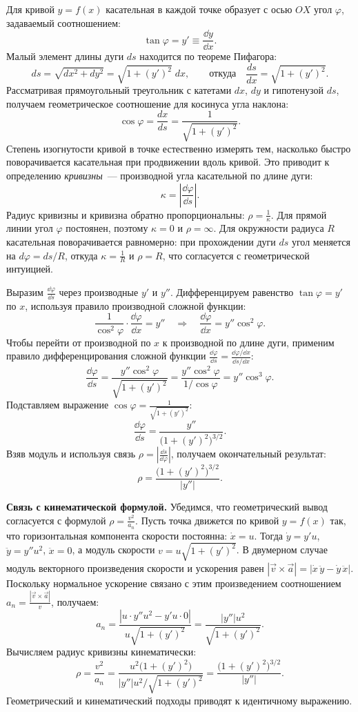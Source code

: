 \documentclass[../main.tex]{subfiles}
\begin{document}
Для кривой $y = f(x)$ касательная в каждой точке образует
с осью $OX$ угол $\varphi$, задаваемый соотношением:
\[
    \tan\varphi = y' \equiv \frac{\dd y}{\dd x}.
\]
Малый элемент длины дуги $ds$ находится по теореме Пифагора:
\[
    ds = \sqrt{dx^2 + dy^2} = \sqrt{1 + (y')^2}\;dx,
    \qquad\text{откуда}\quad
    \frac{ds}{dx} = \sqrt{1 + (y')^2}.
\]
Рассматривая прямоугольный треугольник с катетами $dx$, $dy$ и гипотенузой $ds$,
получаем геометрическое соотношение для косинуса угла наклона:
\[
    \cos\varphi = \frac{dx}{ds} = \frac{1}{\sqrt{1 + (y')^2}}.
\]
Степень изогнутости кривой в точке естественно измерять тем, насколько быстро
поворачивается касательная при продвижении вдоль кривой. Это приводит к
определению \textit{кривизны}~--- производной угла касательной по длине дуги:
\[
    \kappa = \left|\frac{\dd\varphi}{\dd s}\right|.
\]
Радиус кривизны и кривизна обратно пропорциональны: $\rho = \frac{1}{\kappa}$.
Для прямой линии угол $\varphi$ постоянен, поэтому $\kappa = 0$ и $\rho = \infty$.
Для окружности радиуса $R$ касательная поворачивается равномерно:
при прохождении дуги $ds$ угол меняется на $d\varphi = ds/R$, откуда
$\kappa = \frac{1}{R}$ и $\rho = R$, что согласуется с геометрической интуицией.

Выразим $\frac{\dd\varphi}{\dd s}$ через производные $y'$ и $y''$.
Дифференцируем равенство $\tan\varphi = y'$ по $x$, используя правило
производной сложной функции:
\[
    \frac{1}{\cos^2\varphi}\cdot\frac{\dd\varphi}{\dd x} = y''
    \quad\Longrightarrow\quad
    \frac{\dd\varphi}{\dd x} = y''\cos^2\varphi.
\]
Чтобы перейти от производной по $x$ к производной по длине дуги,
применим правило дифференцирования сложной функции $\frac{\dd\varphi}{\dd s} = \frac{\dd\varphi/\dd x}{\dd s/\dd x}$:
\[
    \frac{\dd\varphi}{\dd s}
    = \frac{y''\cos^2\varphi}{\sqrt{1 + (y')^2}}
    = \frac{y''\cos^2\varphi}{1/\cos\varphi}
    = y''\cos^3\varphi.
\]
Подставляем выражение $\cos\varphi = \frac{1}{\sqrt{1+(y')^2}}$:
\[
    \frac{\dd\varphi}{\dd s} = \frac{y''}{\bigl(1 + (y')^2\bigr)^{3/2}}.
\]
Взяв модуль и используя связь $\rho = \left|\frac{\dd s}{\dd\varphi}\right|$, получаем окончательный результат:
\[
    \boxed{\rho = \frac{\bigl(1 + (y')^2\bigr)^{3/2}}{|y''|}}.
\]

\noindent\textbf{Связь с кинематической формулой.}
Убедимся, что геометрический вывод согласуется с формулой $\rho = \frac{v^2}{a_n}$.
Пусть точка движется по кривой $y = f(x)$ так, что горизонтальная
компонента скорости постоянна: $\dot x = u$. Тогда $\dot y = y'u$,
$\ddot y = y''u^2$, $\ddot x = 0$, а модуль скорости $v = u\sqrt{1+(y')^2}$.
В двумерном случае модуль векторного произведения скорости и ускорения равен
$|\vec{v}\times\vec{a}| = |\dot x\,\ddot y - \dot y\,\ddot x|$. Поскольку
нормальное ускорение связано с этим произведением соотношением
$a_n = \frac{|\vec{v}\times\vec{a}|}{v}$, получаем:
\[
    a_n = \frac{|u \cdot y'' u^2 - y'u\cdot 0|}{u\sqrt{1+(y')^2}}
        = \frac{|y''|u^2}{\sqrt{1+(y')^2}}.
\]
Вычисляем радиус кривизны кинематически:
\[
    \rho = \frac{v^2}{a_n} = \frac{u^2\bigl(1+(y')^2\bigr)}{|y''|u^2/\sqrt{1+(y')^2}}
         = \frac{\bigl(1+(y')^2\bigr)^{3/2}}{|y''|}.
\]
Геометрический и кинематический подходы приводят к идентичному выражению.
\end{document}
